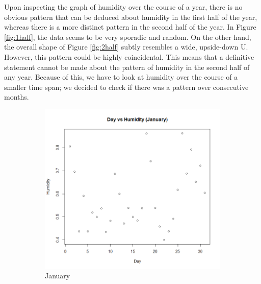 \documentclass[12pt]{article}
\begin{document}
Upon inspecting the graph of humidity over the course of a year, there is no obvious pattern that can be deduced about humidity in the first half of the year, whereas there is a more distinct pattern in the second half of the year. In Figure \ref{fig:1half}, the data seems to be very sporadic and random. On the other hand, the overall shape of Figure \ref{fig:2half} subtly resembles a wide, upside-down U. However, this pattern could be highly coincidental. This means that a definitive statement cannot be made about the pattern of humidity in the second half of any year. Because of this, we have to look at humidity over the course of a smaller time span; we decided to check if there was a pattern over consecutive months.

\begin{figure}[H]
\centering
\begin{subfigure}{.5\textwidth}
  \centering
  \includegraphics[width=1.05\linewidth]{DvsHjan.png}
  \caption{January}
  \label{fig:jan}
\end{subfigure}%
\begin{subfigure}{.5\textwidth}
  \centering

\end{subfigure}
\end{figure}
\end{document}
